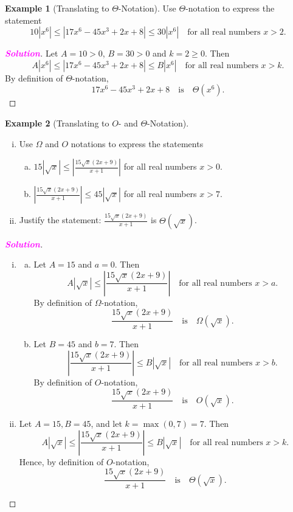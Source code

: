 \documentclass[12pt,openany]{book}
\theoremstyle{definition}
\newtheorem{example}{Example}[chapter]
\renewcommand{\abs}[1]{\left\lvert #1 \right\rvert}
\newcommand{\sol}{\textcolor{magenta}{\bf Solution}}
\begin{document}
	\vspace{20pt}
	\begin{example}[Translating to \(\Theta\)-Notation]
		Use \(\Theta\)-notation to express the statement \[
		10|x^6|\leq|17x^6-45x^3+2x+8|\leq 30|x^6|\quad\text{for all real numbers $x>2$}.
		\]
		\begin{proof}[\sol]
			Let $A=10>0$, $B=30>0$ and $k=2\geq 0$. Then \[
			A|x^6|\leq|17x^6-45x^3+2x+8|\leq B|x^6|\quad\text{for all real numbers $x>k$}.	
			\] By definition of \(\Theta\)-notation, \[
			17x^6-45x^3+2x+8\quad\text{is}\quad\Theta(x^6).
			\]
		\end{proof}
	\end{example}
	\vspace{10pt}
	\begin{example}[Translating to \(O\)- and \(\Theta\)-Notation]
		\ \begin{enumerate}[(i)]
			\item Use $\Omega$ and $O$ notations to express the statements
			\begin{enumerate}[a.]
				\item $\displaystyle 15|\sqrt{x}|\leq\abs{\frac{15\sqrt{x}(2x+9)}{x+1}}$ for all real numbers \(x>0\).
				\item $\displaystyle \abs{\frac{15\sqrt{x}(2x+9)}{x+1}}\leq45|\sqrt{x}|$ for all real numbers \(x>7\).
			\end{enumerate}
			\item Justify the statement: $\displaystyle \frac{15\sqrt{x}(2x+9)}{x+1}$ is \(\Theta(\sqrt{x})\).
		\end{enumerate}
		\newpage
		\begin{proof}[\sol]
			\ \begin{enumerate}[(i)]
				\item \begin{enumerate}[a.]
					\item Let $A=15$ and $a=0$. Then \[
					A|\sqrt{x}|\leq\abs{\frac{15\sqrt{x}(2x+9)}{x+1}}\quad\text{for all real numbers $x>a$}.	
					\] By definition of \(\Omega\)-notation, \[
					\frac{15\sqrt{x}(2x+9)}{x+1}\quad\text{is}\quad\Omega(\sqrt{x}).
					\]
					\item Let $B=45$ and $b=7$. Then \[
					\abs{\frac{15\sqrt{x}(2x+9)}{x+1}}\leq B|\sqrt{x}|\quad\text{for all real numbers $x>b$}.	
					\] By definition of \(O\)-notation, \[
					\frac{15\sqrt{x}(2x+9)}{x+1}\quad\text{is}\quad O(\sqrt{x}).
					\]
				\end{enumerate}
				\item Let $A=15,B=45$, and let $k=\max(0,7)=7$. Then \[
				A|\sqrt{x}|\leq\abs{\frac{15\sqrt{x}(2x+9)}{x+1}}\leq B|\sqrt{x}|\quad\text{for all real numbers $x>k$}.	
				\] Hence, by definition of \(O\)-notation, \[
				\frac{15\sqrt{x}(2x+9)}{x+1}\quad\text{is}\quad \Theta(\sqrt{x}).
				\]
			\end{enumerate}
		\end{proof}
	\end{example}
	
\end{document}
